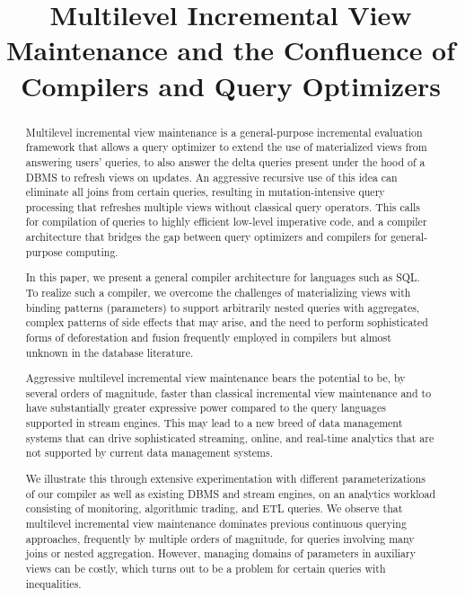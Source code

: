 \documentclass{sig-alternate}
\title{Multilevel Incremental View Maintenance and the Confluence of
Compilers and Query Optimizers}
\author{
}
\newcommand{\comment}[1]{}
\begin{document}
\maketitle


\begin{abstract}
Multilevel incremental view maintenance is a general-purpose incremental
evaluation framework that allows a query optimizer to extend the use of
materialized views from answering users' queries, to also answer the delta
queries present under the hood of a DBMS to refresh views on updates. An
aggressive recursive use of this idea can eliminate all joins from certain
queries, resulting in mutation-intensive query processing that refreshes
multiple views without classical query operators. This calls for compilation of
queries to highly efficient low-level imperative code, and a compiler
architecture that bridges the gap between query optimizers and compilers for
general-purpose computing.


\comment{
Multilevel incremental view maintenance generalizes the idea of using
materialized views for query answering by allowing a query optimizer to use
materialized views for also answering delta queries, which are the auxiliary
queries that are used in incremental view maintenance to refresh materialized
views when updates happen. Aggressive recursive use of this idea allows to
eliminate all joins from certain queries and to generate highly efficient
low-level code without classical query operators that performs all query
evaluation and view refreshment work. This calls for the compilation of queries.
}

In this paper, we present a general compiler architecture for languages such as
SQL. To realize such a compiler, we overcome the challenges of materializing
views with binding patterns (parameters) to support arbitrarily nested queries
with aggregates, complex patterns of side effects that may arise, and the need
to perform sophisticated forms of deforestation and fusion frequently employed
in compilers but almost unknown in the database literature.


Aggressive multilevel incremental view maintenance bears the potential to be, by
several orders of magnitude, faster than classical incremental view
maintenance and to have substantially greater expressive power compared to the query
languages supported in stream engines. This may lead to a new breed of data
management systems that can drive sophisticated streaming, online, and real-time
analytics that are not supported by current data management systems.


We illustrate this through extensive experimentation with different
parameterizations of our compiler as well as existing DBMS and stream engines,
on an analytics workload consisting of monitoring, algorithmic trading, and ETL
queries. We observe that multilevel incremental view maintenance dominates
previous continuous querying approaches, frequently by multiple orders of
magnitude, for queries involving many joins or nested aggregation. However,
managing domains of parameters in auxiliary views can be costly, which turns out
to be a problem for certain queries with inequalities.
\end{abstract}
\end{document}

